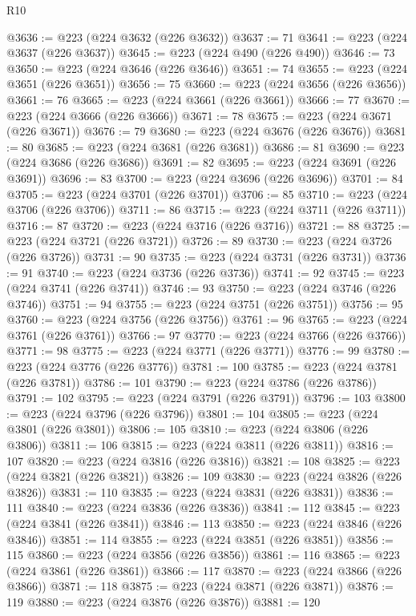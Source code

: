 \begin{lexlean}{R10}
\begin{coremodule}
{{{{{{{{{{{{{{{{{{{{{{{{{{{{{{{{{{{{{{{{{{{{{{{{{{{{{{{{{{{{{{{{{{{{{{{{{{{{{{{{{{{{@3636 := @223 (@224 @3632 (@226 @3632))
@3637 := 71
@3641 := @223 (@224 @3637 (@226 @3637))
@3645 := @223 (@224 @490 (@226 @490))
@3646 := 73
@3650 := @223 (@224 @3646 (@226 @3646))
@3651 := 74
@3655 := @223 (@224 @3651 (@226 @3651))
@3656 := 75
@3660 := @223 (@224 @3656 (@226 @3656))
@3661 := 76
@3665 := @223 (@224 @3661 (@226 @3661))
@3666 := 77
@3670 := @223 (@224 @3666 (@226 @3666))
@3671 := 78
@3675 := @223 (@224 @3671 (@226 @3671))
@3676 := 79
@3680 := @223 (@224 @3676 (@226 @3676))
@3681 := 80
@3685 := @223 (@224 @3681 (@226 @3681))
@3686 := 81
@3690 := @223 (@224 @3686 (@226 @3686))
@3691 := 82
@3695 := @223 (@224 @3691 (@226 @3691))
@3696 := 83
@3700 := @223 (@224 @3696 (@226 @3696))
@3701 := 84
@3705 := @223 (@224 @3701 (@226 @3701))
@3706 := 85
@3710 := @223 (@224 @3706 (@226 @3706))
@3711 := 86
@3715 := @223 (@224 @3711 (@226 @3711))
@3716 := 87
@3720 := @223 (@224 @3716 (@226 @3716))
@3721 := 88
@3725 := @223 (@224 @3721 (@226 @3721))
@3726 := 89
@3730 := @223 (@224 @3726 (@226 @3726))
@3731 := 90
@3735 := @223 (@224 @3731 (@226 @3731))
@3736 := 91
@3740 := @223 (@224 @3736 (@226 @3736))
@3741 := 92
@3745 := @223 (@224 @3741 (@226 @3741))
@3746 := 93
@3750 := @223 (@224 @3746 (@226 @3746))
@3751 := 94
@3755 := @223 (@224 @3751 (@226 @3751))
@3756 := 95
@3760 := @223 (@224 @3756 (@226 @3756))
@3761 := 96
@3765 := @223 (@224 @3761 (@226 @3761))
@3766 := 97
@3770 := @223 (@224 @3766 (@226 @3766))
@3771 := 98
@3775 := @223 (@224 @3771 (@226 @3771))
@3776 := 99
@3780 := @223 (@224 @3776 (@226 @3776))
@3781 := 100
@3785 := @223 (@224 @3781 (@226 @3781))
@3786 := 101
@3790 := @223 (@224 @3786 (@226 @3786))
@3791 := 102
@3795 := @223 (@224 @3791 (@226 @3791))
@3796 := 103
@3800 := @223 (@224 @3796 (@226 @3796))
@3801 := 104
@3805 := @223 (@224 @3801 (@226 @3801))
@3806 := 105
@3810 := @223 (@224 @3806 (@226 @3806))
@3811 := 106
@3815 := @223 (@224 @3811 (@226 @3811))
@3816 := 107
@3820 := @223 (@224 @3816 (@226 @3816))
@3821 := 108
@3825 := @223 (@224 @3821 (@226 @3821))
@3826 := 109
@3830 := @223 (@224 @3826 (@226 @3826))
@3831 := 110
@3835 := @223 (@224 @3831 (@226 @3831))
@3836 := 111
@3840 := @223 (@224 @3836 (@226 @3836))
@3841 := 112
@3845 := @223 (@224 @3841 (@226 @3841))
@3846 := 113
@3850 := @223 (@224 @3846 (@226 @3846))
@3851 := 114
@3855 := @223 (@224 @3851 (@226 @3851))
@3856 := 115
@3860 := @223 (@224 @3856 (@226 @3856))
@3861 := 116
@3865 := @223 (@224 @3861 (@226 @3861))
@3866 := 117
@3870 := @223 (@224 @3866 (@226 @3866))
@3871 := 118
@3875 := @223 (@224 @3871 (@226 @3871))
@3876 := 119
@3880 := @223 (@224 @3876 (@226 @3876))
@3881 := 120
}}}}}}}}}}}}}}}}}}}}}}}}}}}}}}}}}}}}}}}}}}}}}}}}}}}}}}}}}}}}}}}}}}}}}}}}}}}}}}}}}}}}
\end{coremodule}
\end{lexlean}
